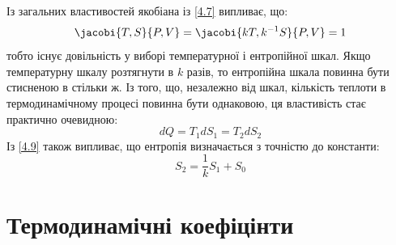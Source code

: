 Із загальних властивостей якобіана із \eqref{4.7} випливає, що:
\begin{equation}\label{4.8}
	\jacobi{T,S}{P,V} = \jacobi{kT,k^{-1}S}{P,V}=1
\end{equation}
тобто існує довільність у виборі температурної і ентропійної шкал. Якщо температурну шкалу розтягнути
в $k$ разів, то ентропійна шкала повинна бути стисненою в стільки ж. Із того, що, незалежно від шкал,
кількість теплоти в термодинамічному процесі повинна бути однаковою, ця властивість стає практично
очевидною:
\begin{equation}\label{4.9}
	dQ = T_1dS_1=T_2dS_2
\end{equation}
Із \eqref{4.9} також випливає, що ентропія визначається з точністю до константи:
\begin{equation}\label{4.10}
	S_2=\dfrac{1}{k}S_1+S_0
\end{equation}

\section{Термодинамічні коефіцінти}

